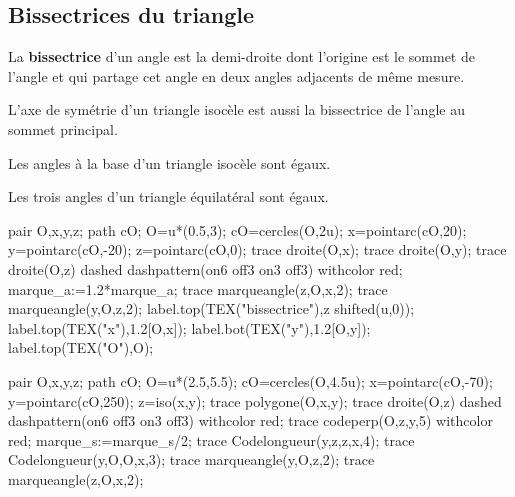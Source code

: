 \begin{changemargin}{0mm}{-15mm}
    \section{Bissectrices du triangle}

    \begin{definition}
        La \textbf{bissectrice} d'un angle est la demi-droite dont l'origine est le sommet de l'angle et qui partage cet angle en deux angles adjacents de même mesure.
    \end{definition}
    \begin{propriete}[\admise]
        L'axe de symétrie d'un triangle isocèle est aussi la bissectrice de l'angle au sommet principal.
    \end{propriete}
    \begin{propriete}[\admise]
        Les angles à la base d'un triangle isocèle sont égaux.
    \end{propriete}
    \begin{propriete}[\admise]
        Les trois angles d'un triangle équilatéral sont égaux.
    \end{propriete}
    \begin{Geometrie}[CoinHD={(5u,6u)}]
        pair O,x,y,z;
        path cO;
        O=u*(0.5,3);
        cO=cercles(O,2u);
        x=pointarc(cO,20);
        y=pointarc(cO,-20);
        z=pointarc(cO,0);
        trace droite(O,x);
        trace droite(O,y);
        trace droite(O,z) dashed dashpattern(on6 off3 on3 off3) withcolor red;
        marque_a:=1.2*marque_a;
        trace marqueangle(z,O,x,2);
        trace marqueangle(y,O,z,2);
        label.top(TEX("bissectrice"),z shifted(u,0));
        label.top(TEX("x"),1.2[O,x]);
        label.bot(TEX("y"),1.2[O,y]);
        label.top(TEX("O"),O);
    \end{Geometrie}
    \hspace*{10mm}
    \begin{Geometrie}[CoinHD={(6u,6u)}]
        pair O,x,y,z;
        path cO;
        O=u*(2.5,5.5);
        cO=cercles(O,4.5u);
        x=pointarc(cO,-70);
        y=pointarc(cO,250);
        z=iso(x,y);
        trace polygone(O,x,y);
        trace droite(O,z) dashed dashpattern(on6 off3 on3 off3) withcolor red;
        trace codeperp(O,z,y,5) withcolor red;
        marque_s:=marque_s/2;
        trace Codelongueur(y,z,z,x,4);
        trace Codelongueur(y,O,O,x,3);
        trace marqueangle(y,O,z,2);
        trace marqueangle(z,O,x,2);
    \end{Geometrie}

\end{changemargin}
